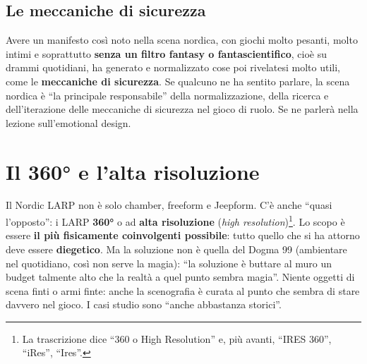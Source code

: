 \subsection{Le meccaniche di sicurezza}

Avere un manifesto così noto nella scena nordica, con giochi molto pesanti, molto
intimi e soprattutto \textbf{senza un filtro fantasy o fantascientifico}, cioè
su drammi quotidiani, ha generato e normalizzato cose poi rivelatesi molto utili,
come le \textbf{meccaniche di sicurezza}. Se qualcuno ne ha sentito parlare, la
scena nordica è ``la principale responsabile'' della normalizzazione, della
ricerca e dell'iterazione delle meccaniche di sicurezza nel gioco di ruolo. Se ne
parlerà nella lezione sull'emotional design.

\section{Il 360° e l'alta risoluzione}
\label{a2:sec:360}



Il Nordic LARP non è solo chamber, freeform e Jeepform. C'è anche ``quasi
l'opposto'': i LARP \textbf{360°} o ad \textbf{alta risoluzione} (\emph{high
resolution})\footnote{La trascrizione dice ``360 o High Resolution'' e, più
avanti, ``IRES 360'', ``iRes'', ``Ires''.}. Lo scopo è essere \textbf{il più
fisicamente coinvolgenti possibile}: tutto quello che si ha attorno deve essere
\textbf{diegetico}. Ma la soluzione non è quella del Dogma 99 (ambientare nel
quotidiano, così non serve la magia): ``la soluzione è buttare al muro un budget
talmente alto che la realtà a quel punto sembra magia''. Niente oggetti di scena
finti o armi finte: anche la scenografia è curata al punto che sembra di stare
davvero nel gioco. I casi studio sono ``anche abbastanza storici''.

